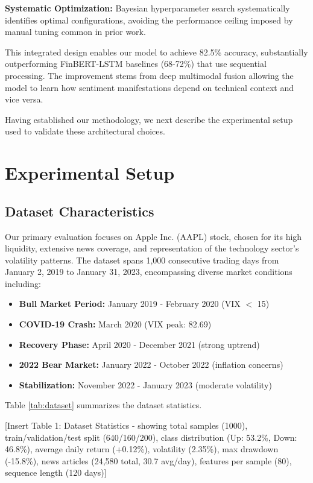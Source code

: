 \documentclass[conference]{IEEEtran}
\begin{document}
\textbf{Systematic Optimization:} Bayesian hyperparameter search systematically identifies optimal configurations, avoiding the performance ceiling imposed by manual tuning common in prior work.

This integrated design enables our model to achieve 82.5\% accuracy, substantially outperforming FinBERT-LSTM baselines (68-72\%) that use sequential processing. The improvement stems from deep multimodal fusion allowing the model to learn how sentiment manifestations depend on technical context and vice versa.

Having established our methodology, we next describe the experimental setup used to validate these architectural choices.

\section{Experimental Setup}

\subsection{Dataset Characteristics}

Our primary evaluation focuses on Apple Inc. (AAPL) stock, chosen for its high liquidity, extensive news coverage, and representation of the technology sector's volatility patterns. The dataset spans 1,000 consecutive trading days from January 2, 2019 to January 31, 2023, encompassing diverse market conditions including:

\begin{itemize}
\item \textbf{Bull Market Period:} January 2019 - February 2020 (VIX $<$ 15)
\item \textbf{COVID-19 Crash:} March 2020 (VIX peak: 82.69)
\item \textbf{Recovery Phase:} April 2020 - December 2021 (strong uptrend)
\item \textbf{2022 Bear Market:} January 2022 - October 2022 (inflation concerns)
\item \textbf{Stabilization:} November 2022 - January 2023 (moderate volatility)
\end{itemize}

Table \ref{tab:dataset} summarizes the dataset statistics.

[Insert Table 1: Dataset Statistics - showing total samples (1000), train/validation/test split (640/160/200), class distribution (Up: 53.2\%, Down: 46.8\%), average daily return (+0.12\%), volatility (2.35\%), max drawdown (-15.8\%), news articles (24,580 total, 30.7 avg/day), features per sample (80), sequence length (120 days)]
\end{document}
